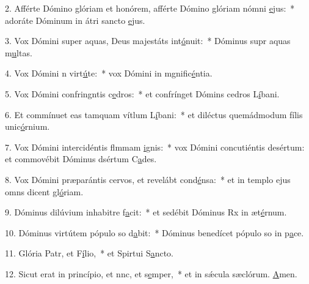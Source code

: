 2. Afférte Dómino glóriam et honórem, afférte Dómino glóriam nómni \uline{e}jus:~* adoráte Dóminum in átri sancto \uline{e}jus.\par 
3. Vox Dómini super aquas, Deus majestáts int\uline{ó}nuit:~* Dóminus supr aquas m\uline{u}ltas.\par 
4. Vox Dómini n virt\uline{ú}te:~* vox Dómini in mgnific\uline{é}ntia.\par 
5. Vox Dómini confringntis c\uline{e}dros:~* et confrínget Dómins cedros L\uline{í}bani.\par 
6. Et commínuet eas tamquam vítlum L\uline{í}bani:~* et diléctus quemádmodum fílis unic\uline{ó}rnium.\par 
7. Vox Dómini intercidéntis flmmam \uline{i}gnis:~* vox Dómini concutiéntis desértum: et commovébit Dóminus dsértum C\uline{a}des.\par 
8. Vox Dómini præparántis cervos, et revelábt cond\uline{é}nsa:~* et in templo ejus omns dicent gl\uline{ó}riam.\par 
9. Dóminus dilúvium inhabitre f\uline{a}cit:~* et sedébit Dóminus Rx in æt\uline{é}rnum.\par 
10. Dóminus virtútem pópulo so d\uline{a}bit:~* Dóminus benedícet pópulo so in p\uline{a}ce.\par 
11. Glória Patr, et F\uline{í}lio,~* et Spirtui S\uline{a}ncto.\par 
12. Sicut erat in princípio, et nnc, et s\uline{e}mper,~* et in sǽcula sæclórum. \uline{A}men.\par 
